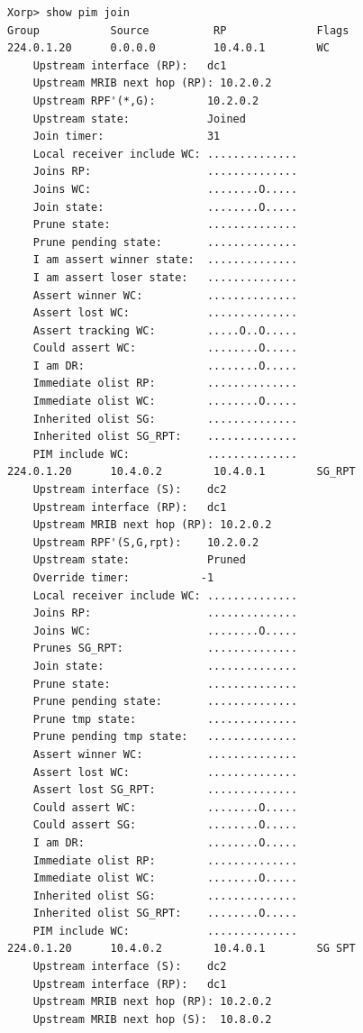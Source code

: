 \documentclass[11pt]{report}
\begin{document}
\begin{itemize}
\begin{verbatim}
Xorp> show pim join 
Group           Source          RP              Flags
224.0.1.20      0.0.0.0         10.4.0.1        WC   
    Upstream interface (RP):   dc1
    Upstream MRIB next hop (RP): 10.2.0.2
    Upstream RPF'(*,G):        10.2.0.2
    Upstream state:            Joined 
    Join timer:                31
    Local receiver include WC: ..............
    Joins RP:                  ..............
    Joins WC:                  ........O.....
    Join state:                ........O.....
    Prune state:               ..............
    Prune pending state:       ..............
    I am assert winner state:  ..............
    I am assert loser state:   ..............
    Assert winner WC:          ..............
    Assert lost WC:            ..............
    Assert tracking WC:        .....O..O.....
    Could assert WC:           ........O.....
    I am DR:                   ........O.....
    Immediate olist RP:        ..............
    Immediate olist WC:        ........O.....
    Inherited olist SG:        ..............
    Inherited olist SG_RPT:    ..............
    PIM include WC:            ..............
224.0.1.20      10.4.0.2        10.4.0.1        SG_RPT 
    Upstream interface (S):    dc2
    Upstream interface (RP):   dc1
    Upstream MRIB next hop (RP): 10.2.0.2
    Upstream RPF'(S,G,rpt):    10.2.0.2
    Upstream state:            Pruned 
    Override timer:           -1
    Local receiver include WC: ..............
    Joins RP:                  ..............
    Joins WC:                  ........O.....
    Prunes SG_RPT:             ..............
    Join state:                ..............
    Prune state:               ..............
    Prune pending state:       ..............
    Prune tmp state:           ..............
    Prune pending tmp state:   ..............
    Assert winner WC:          ..............
    Assert lost WC:            ..............
    Assert lost SG_RPT:        ..............
    Could assert WC:           ........O.....
    Could assert SG:           ........O.....
    I am DR:                   ........O.....
    Immediate olist RP:        ..............
    Immediate olist WC:        ........O.....
    Inherited olist SG:        ..............
    Inherited olist SG_RPT:    ........O.....
    PIM include WC:            ..............
224.0.1.20      10.4.0.2        10.4.0.1        SG SPT 
    Upstream interface (S):    dc2
    Upstream interface (RP):   dc1
    Upstream MRIB next hop (RP): 10.2.0.2
    Upstream MRIB next hop (S):  10.8.0.2

\end{verbatim}
\end{itemize}
\end{document}
